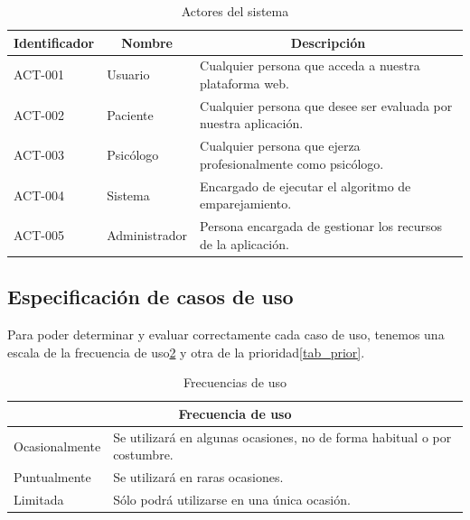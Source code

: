 \begin{table}[htpb]
\centering
\begin{tabularx}{\textwidth}{|l|X|X|}
\hline
\multicolumn{1}{|c|}{\textbf{Identificador}} & \multicolumn{1}{c|}{\textbf{Nombre}} & \multicolumn{1}{c|}{\textbf{Descripción}}                                 \\ \hline
ACT-001                             & Usuario                     & Cualquier persona que acceda a nuestra plataforma web.           \\ \hline
ACT-002                             & Paciente                    & Cualquier persona que desee ser evaluada por nuestra aplicación. \\ \hline
ACT-003                             & Psicólogo                   & Cualquier persona que ejerza profesionalmente como psicólogo.    \\ \hline
ACT-004                             & Sistema                     & Encargado de ejecutar el algoritmo de emparejamiento.            \\ \hline
ACT-005                             & Administrador               & Persona encargada de gestionar los recursos de la aplicación.    \\ \hline
\end{tabularx}
\caption{Actores del sistema}
\label{tab_actores}
\end{table}


\subsection{Especificación de casos de uso}
Para poder determinar y evaluar correctamente cada caso de uso, tenemos una escala de la frecuencia de uso\ref{tab_frec_uso} y otra de la prioridad\ref{tab_prior}.

\begin{table}[htpb]
\centering
\begin{tabularx}{\textwidth}{|l|X|}
\hline
\multicolumn{2}{|c|}{\textbf{Frecuencia de uso}}                                                   \\ \hline
Ocasionalmente & Se utilizará en algunas ocasiones, no de forma habitual o por costumbre. \\ \hline
Puntualmente   & Se utilizará en raras ocasiones.                                         \\ \hline
Limitada       & Sólo podrá utilizarse en una única ocasión.                              \\ \hline
\end{tabularx}
\caption{Frecuencias de uso}
\label{tab_frec_uso}
\end{table}


